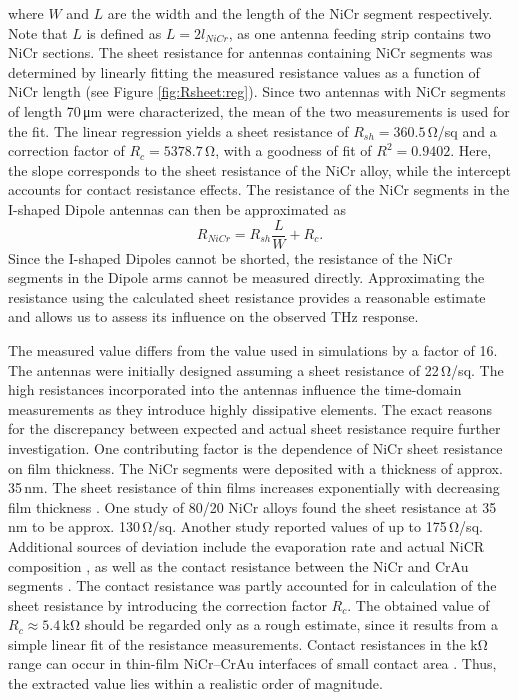where $W$ and $L$  are the width and the length of the NiCr segment respectively. Note that $L$ is defined as $L = 2l_{NiCr}$, as one antenna feeding strip contains two NiCr sections. The sheet resistance for antennas containing NiCr segments was determined by linearly fitting the measured resistance values as a function of NiCr length (see Figure \ref{fig:Rsheet:reg}). Since two antennas with NiCr segments of length \num{70}\,\si{\micro \meter} were characterized, the mean of the two measurements is used for the fit. The linear regression yields a sheet resistance of $R_{sh} = 360.5$\,\si{\ohm}/sq and a correction factor of $R_c = 5378.7$\,\si{\ohm}, with a goodness of fit of $R^2 = 0.9402$. Here, the slope corresponds to the sheet resistance of the NiCr alloy, while the intercept accounts for contact resistance effects. The resistance of the NiCr segments in the I-shaped Dipole antennas can then be approximated as
\begin{equation}
   R_{NiCr} = R_{sh}\frac{L}{W} + R_c. 
\end{equation}
Since the I-shaped Dipoles cannot be shorted, the resistance of the NiCr segments in the Dipole arms cannot be measured directly. Approximating the resistance using the calculated sheet resistance provides a reasonable estimate and allows us to assess its influence on the observed THz response.

The measured value differs from the value used in simulations by a factor of \num{16}. The antennas were initially designed assuming a sheet resistance of \num{22}\,\si{\ohm}/sq. The high resistances incorporated into the antennas influence the time-domain measurements as they introduce highly dissipative elements. The exact reasons for the discrepancy between expected and actual sheet resistance require further investigation. One contributing factor is the dependence of NiCr sheet resistance on film thickness. The NiCr segments were deposited with a thickness of approx. \num{35}\,\si{\nano \meter}. The sheet resistance of thin films increases exponentially with decreasing film thickness \cite{wittElectromechanicalPropertiesThin1974}. One study of \num{80}/\num{20} NiCr alloys found the sheet resistance at \num{35}\,\si{\nano \meter} to be approx. \num{130}\,\si{\ohm}/sq. Another study reported values of up to \num{175}\,\si{\ohm}/sq. Additional sources of deviation include the evaporation rate and actual NiCR composition \cite{rolkeNichromeThinFilm1981}, as well as the contact resistance between the NiCr and CrAu segments \cite{zhangAnalysisCurrentCrowding2015}. The contact resistance was partly accounted for in calculation of the sheet resistance by introducing the correction factor $R_c$. The obtained value of $R_c \approx 5.4$\,\si{\kilo \ohm} should be regarded only as a rough estimate, since it results from a simple linear fit of the resistance measurements. Contact resistances in the \si{\kilo \ohm} range can occur in thin-film NiCr–CrAu interfaces of small contact area \cite{naharElectricalPropertiesRF1983}. Thus, the extracted value lies within a realistic order of magnitude. 

